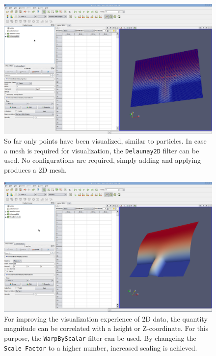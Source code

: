 \begin{figure}[!ht]
\includegraphics[width=0.9\columnwidth]{figures/para6.eps}
\caption{
So far only points have been visualized, similar to particles.
In case a mesh is required for visualization, the \texttt{Delaunay2D} filter can be used.
No configurations are required, simply adding and applying produces a 2D mesh.
}
\label{fig:para6}
\end{figure}

\begin{figure}[!ht]
\includegraphics[width=0.9\columnwidth]{figures/para7.eps}
\caption{
For improving the visualization experience of 2D data, the quantity magnitude
can be correlated with a height or Z-coordinate. For this purpose, the \texttt{WarpByScalar} filter can be used.
By changeing the \texttt{Scale Factor} to a higher number, increased scaling is achieved.
}
\label{fig:para7}
\end{figure}
